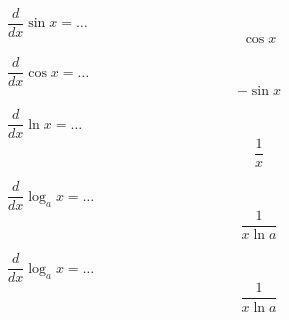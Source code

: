 \documentclass[avery5371,grid]{flashcards}
\begin{document}
\begin{flashcard}[Definition]{$\dfrac{d}{dx}\sin x = \ldots$}
    \begin{equation}
        \cos x
    \end{equation}
\end{flashcard}

\begin{flashcard}[Definition]{$\dfrac{d}{dx}\cos x = \ldots$}
    \begin{equation}
        -\sin x
    \end{equation}
\end{flashcard}

\begin{flashcard}[Definition]{$\dfrac{d}{dx}\ln x = \ldots$}
    \begin{equation}
        \frac{1}{x}
    \end{equation}
\end{flashcard}

\begin{flashcard}[Definition]{$\dfrac{d}{dx}\log_a x = \ldots$}
    \begin{equation}
        \frac{1}{x \ln a}
    \end{equation}
\end{flashcard}

\begin{flashcard}[Definition]{$\dfrac{d}{dx}\log_a x = \ldots$}
    \begin{equation}
        \frac{1}{x \ln a}
    \end{equation}
\end{flashcard}
\end{document}
